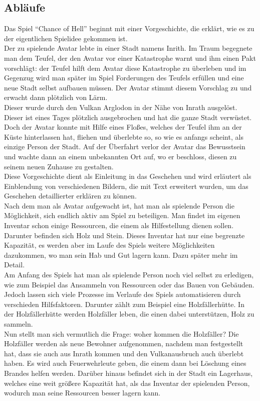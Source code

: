 \documentclass[paper=A4,pagesize=auto,12pt,headinclude=true,footinclude=true,BCOR=0mm,DIV=calc]{scrartcl}
\newcommand{\sectionspace}{
	\vspace{0.5cm}
}
\begin{document}
\sectionspace
\subsection{Abläufe}\label{sec:Ablaeufe}
Das Spiel "`Chance of Hell"' beginnt mit einer Vorgeschichte, die erklärt, wie es zu der eigentlichen Spielidee gekommen ist. \\
Der zu spielende Avatar lebte in einer Stadt namens Inrith. Im Traum begegnete man dem Teufel, der den Avatar vor einer Katastrophe warnt und ihm einen Pakt vorschlägt: der Teufel hilft dem Avatar diese Katastrophe zu überleben und im Gegenzug wird man später im Spiel Forderungen des Teufels erfüllen und eine neue Stadt selbst aufbauen müssen. Der Avatar stimmt diesem Vorschlag zu und erwacht dann plötzlich von Lärm. \\
Dieser wurde durch den Vulkan Arglodon in der Nähe von Inrath ausgelöst. Dieser ist eines Tages plötzlich ausgebrochen und hat die ganze Stadt verwüstet. Doch der Avatar konnte mit Hilfe eines Floßes, welches der Teufel ihm an der Küste hinterlassen hat, fliehen und überlebte so, so wie es anfangs scheint, als einzige Person der Stadt. Auf der Überfahrt verlor der Avatar das Bewusstsein und wachte dann an einem unbekannten Ort auf, wo er beschloss, diesen zu seinem neuen Zuhause zu gestalten. \\
Diese Vorgeschichte dient als Einleitung in das Geschehen und wird erläutert als Einblendung von verschiedenen Bildern, die mit Text erweitert wurden, um das Geschehen detaillierter erklären zu können. \\
Nach dem man als Avatar aufgewacht ist, hat man als spielende Person die Möglichkeit, sich endlich aktiv am Spiel zu beteiligen. Man findet im eigenen Inventar schon einige Ressourcen, die einem als Hilfestellung dienen sollen. Darunter befinden sich Holz und Stein. Dieses Inventar hat nur eine begrenzte Kapazität, es werden aber im Laufe des Spiels weitere Möglichkeiten dazukommen, wo man sein Hab und Gut lagern kann. Dazu später mehr im Detail. \\
Am Anfang des Spiels hat man als spielende Person noch viel selbst zu erledigen, wie zum Beispiel das Ansammeln von Ressourcen oder das Bauen von Gebäuden. Jedoch lassen sich viele Prozesse im Verlaufe des Spiels automatisieren durch verschieden Hilfsfaktoren. Darunter zählt zum Beispiel eine Holzfällerhütte. In der Holzfällerhütte werden Holzfäller leben, die einen dabei unterstützen, Holz zu sammeln. \\
Nun stellt man sich vermutlich die Frage: woher kommen die Holzfäller? Die Holzfäller werden als neue Bewohner aufgenommen, nachdem man festgestellt hat, dass sie auch aus Inrath kommen und den Vulkanausbruch auch überlebt haben. Es wird auch Feuerwehrleute geben, die einem dann bei Löschung eines Brandes helfen werden. Darüber hinaus befindet sich in der Stadt ein Lagerhaus, welches eine weit größere Kapazität hat, als das Inventar der spielenden Person, wodurch man seine Ressourcen besser lagern kann. \\
\end{document}
